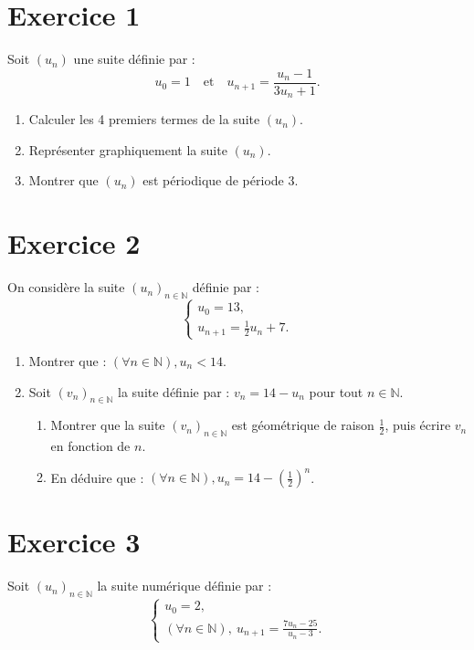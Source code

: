 \documentclass[a4paper,11pt]{article}
\begin{document}
\section*{Exercice 1}

Soit \((u_n)\) une suite définie par :
\[
u_0 = 1 \quad \text{et} \quad u_{n+1} = \frac{u_n - 1}{3u_n + 1}.
\]

\begin{enumerate}
    \item Calculer les 4 premiers termes de la suite \((u_n)\).
    \item Représenter graphiquement la suite \((u_n)\).
    \item Montrer que \((u_n)\) est périodique de période 3.
\end{enumerate}

\section*{Exercice 2}

On considère la suite \((u_n)_{n \in \mathbb{N}}\) définie par :
\[
\begin{cases}
u_0 = 13, \\
u_{n+1} = \frac{1}{2} u_n + 7.
\end{cases}
\]

\begin{enumerate}
    \item Montrer que : \((\forall n \in \mathbb{N}), u_n < 14\).
    \item Soit \((v_n)_{n \in \mathbb{N}}\) la suite définie par : \(v_n = 14 - u_n\) pour tout \(n \in \mathbb{N}\).
    \begin{enumerate}
        \item Montrer que la suite \((v_n)_{n \in \mathbb{N}}\) est géométrique de raison \(\frac{1}{2}\), puis écrire \(v_n\) en fonction de \(n\).
        \item En déduire que : \((\forall n \in \mathbb{N}), u_n = 14 - \left( \frac{1}{2} \right)^n\).
    \end{enumerate}
\end{enumerate}

\section*{Exercice 3}

Soit \((u_n)_{n \in \mathbb{N}}\) la suite numérique définie par :
\[
\begin{cases}
u_0 = 2, \\
(\forall n \in \mathbb{N}), \ u_{n+1} = \frac{7u_n - 25}{u_n - 3}.
\end{cases}
\]
\end{document}
